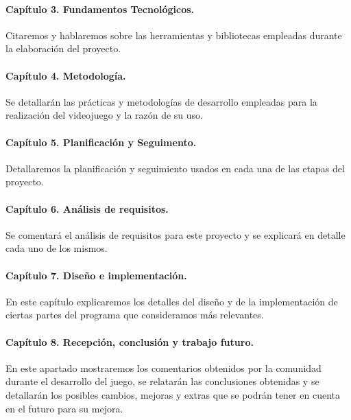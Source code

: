 \paragraph*{Capítulo 3. Fundamentos Tecnológicos.}
Citaremos y hablaremos sobre las herramientas y bibliotecas empleadas durante la elaboración del proyecto.

\paragraph*{Capítulo 4. Metodología.}
Se detallarán las prácticas y metodologías de desarrollo empleadas para la realización del videojuego y la razón de su uso.

\paragraph*{Capítulo 5. Planificación y Seguimento.}
Detallaremos la planificación y seguimiento usados en cada una de las etapas del proyecto. 

\paragraph*{Capítulo 6. Análisis de requisitos.}
Se comentará el análisis de requisitos para este proyecto y se explicará en detalle cada uno de los mismos.

\paragraph*{Capítulo 7. Diseño e implementación.}
En este capítulo explicaremos los detalles del diseño y de la implementación de ciertas partes del programa que consideramos más relevantes.

\paragraph*{Capítulo 8. Recepción, conclusión y trabajo futuro.}
En este apartado mostraremos los comentarios obtenidos por la comunidad durante el desarrollo del juego, se relatarán las conclusiones obtenidas y se detallarán los posibles cambios, mejoras y extras que se podrán tener en cuenta en el futuro para su mejora.
